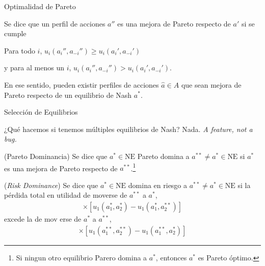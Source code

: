 \documentclass[notes, 11pt]{beamer} %
\newenvironment{wideitemize}{\itemize\addtolength{\itemsep}{10pt}}{\enditemize}
\begin{document}
\begin{frame}{Optimalidad de Pareto}
\begin{wideitemize}
	\item<1-> Se dice que un perfil de acciones $a''$ es una mejora de Pareto respecto de $a'$ si se cumple 
	\begin{wideitemize}
		\item<2->[--] Para todo $i$, $u_{i}( a_{i}'',a_{-i}'' ) \geq u_{i}( a_{i}',a_{-i}' )$
		\item<3->[--] y para al menos un $i$, $u_{i}( a_{i}'',a_{-i}'' ) > u_{i}( a_{i}',a_{-i}' )$.
	\end{wideitemize}

	\item<4-> En ese sentido, pueden existir perfiles de acciones $\hat{a} \in A$ que sean mejora de Pareto respecto de un equilibrio de Nash $a^{*}$.

\end{wideitemize}
\end{frame}

\begin{frame}{Selecci\'on de Equilibrios}
\begin{wideitemize}
	\item<1-> ¿Qu\'e hacemos si tenemos m\'ultiples equilibrios de Nash? Nada. \textit{A feature, not a bug.}
	\begin{wideitemize}
		\item<2->[--] (Pareto Dominancia) Se dice que $a^{*} \in \text{NE}$ Pareto domina a $a^{**} \neq a^{*} \in \text{NE}$ si $a^{*}$ es una mejora de Pareto respecto de $a^{**}$.\footnote{Si ningun otro equilibrio Parero domina a $a^{*}$, entonces $a^{*}$ es Pareto \'optimo.}
		\item<3->[--] (\textit{Risk Dominance}) Se dice que $a^{*} \in \text{NE}$ domina en riesgo a $a^{**} \neq a^{*} \in \text{NE}$ si la p\'erdida total en utilidad de moverse de $a^{**}$ a $a^{*}$,
		\begin{align*}
			[u_{1}(a_{1}^{*}, a_{2}^{*}) - u_{1}(a_{1}^{**}, a_{2}^{*})] \times [u_{1}(a_{1}^{*}, a_{2}^{*}) - u_{1}(a_{1}^{*}, a_{2}^{**})]
		\end{align*} excede la de mov erse de $a^{*}$ a $a^{**}$,
		\begin{align*}
			[u_{1}(a_{1}^{**}, a_{2}^{**}) - u_{1}(a_{1}^{*}, a_{2}^{**})] \times [u_{1}(a_{1}^{**}, a_{2}^{**}) - u_{1}(a_{1}^{**}, a_{2}^{*})]
		\end{align*}
	\end{wideitemize}
\end{wideitemize}
\end{frame}
\end{document}
